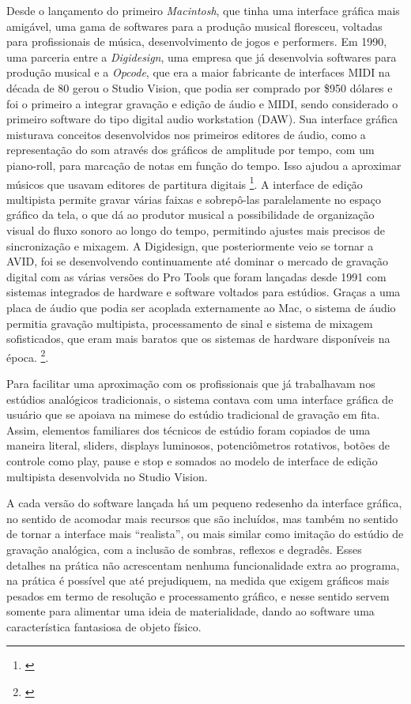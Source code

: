 {Desde o lançamento do primeiro \emph{Macintosh}, que tinha uma interface gráfica mais amigável, uma gama de softwares para a produção musical floresceu, voltadas para profissionais de música, desenvolvimento de jogos e performers. Em 1990, uma parceria entre a \emph{Digidesign}, uma empresa que já desenvolvia softwares para produção musical e a \emph{Opcode}, que era a maior fabricante de interfaces MIDI na década de 80 gerou o Studio Vision, que podia ser comprado por \$950 dólares e foi o primeiro a integrar gravação e edição de áudio e MIDI, sendo considerado o primeiro software do tipo digital audio workstation (DAW). Sua interface gráfica misturava conceitos desenvolvidos nos primeiros editores de áudio, como a representação do som através dos gráficos de amplitude por tempo, com um piano-roll, para marcação de notas em função do tempo. Isso ajudou a aproximar músicos que usavam editores de partitura digitais \footnote{\cite{ChrisHalaby2011}}. A interface de edição multipista permite gravar várias faixas e sobrepô-las paralelamente no espaço gráfico da tela, o que dá ao produtor musical a possibilidade de organização visual do fluxo sonoro ao longo do tempo, permitindo ajustes mais precisos de sincronização e mixagem. A Digidesign, que posteriormente veio se tornar a AVID, foi se desenvolvendo continuamente até dominar o mercado de gravação digital com as várias versões do Pro Tools que foram lançadas desde 1991 com sistemas integrados de hardware e software voltados para estúdios. Graças a uma placa de áudio que podia ser acoplada externamente ao Mac, o sistema de áudio permitia gravação multipista, processamento de sinal e sistema de mixagem sofisticados, que eram mais baratos que os sistemas de hardware disponíveis na época. \footnote{\cite{ChrisHalaby2011}}.

Para facilitar uma aproximação com os profissionais que já trabalhavam nos estúdios analógicos tradicionais, o sistema contava com uma interface gráfica de usuário que se apoiava na mimese do estúdio tradicional de gravação em fita. Assim, elementos familiares dos técnicos de estúdio foram copiados de uma maneira literal, sliders, displays luminosos, potenciômetros rotativos, botões de controle como play, pause e stop e somados ao modelo de interface de edição multipista desenvolvida no Studio Vision. 

A cada versão do software lançada há um pequeno redesenho da interface gráfica, no sentido de acomodar mais recursos que são incluídos, mas também no sentido de tornar a interface mais “realista”, ou mais similar como imitação do estúdio de gravação analógica, com a inclusão de sombras, reflexos e degradês. Esses detalhes na prática não acrescentam nenhuma funcionalidade extra ao programa, na prática é possível que até prejudiquem, na medida que exigem gráficos mais pesados em termo de resolução e processamento gráfico, e nesse sentido servem somente para alimentar uma ideia de materialidade, dando ao software uma característica fantasiosa de objeto físico. 

}
